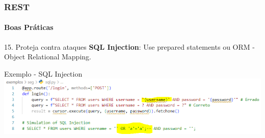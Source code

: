 \documentclass[
	9pt, %
	t, %
]{beamer}
\newcommand{\yellowbox}[1]{\colorbox{yellow!75}{#1}}
\begin{document}





\begin{frame}
	\frametitle{REST}
	\framesubtitle{Boas Práticas}

	\begin{block}{15. Proteja contra ataques}
		\textbf{SQL Injection}: Use \yellowbox{prepared statements} ou \yellowbox{ORM - Object Relational Mapping}.
	\end{block}

	\begin{exampleblock}{Exemplo - SQL Injection}
		\includegraphics[width=0.9\linewidth]{sql_injection.png}
	\end{exampleblock}

\end{frame}
\end{document}
